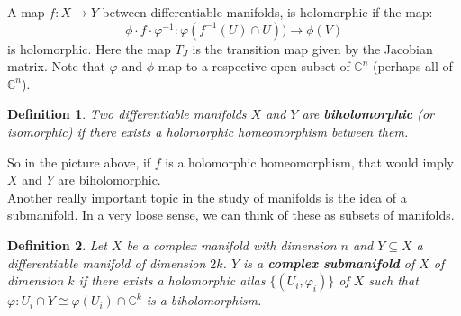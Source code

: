 \documentclass[12pt, letterpaper]{article}
\newtheorem{definition}{Definition}[section]
\newcommand{\C}{\mathbb{C}}
\newcommand{\ten}[1]{\textnormal{\textbf{#1}}}
\begin{document}
\begin{center}
\end{center}

\vspace{.5cm}

A map $f: X \to Y$ between differentiable manifolds, is holomorphic if the map:
\begin{equation*}
    \phi \cdot f \cdot \varphi^{-1}: \varphi(f^{-1}(U)\cap U)) \to \phi(V)
\end{equation*}
is holomorphic. Here the map $T_J$ is the transition map given by the Jacobian matrix.
Note that $\varphi$ and $\phi$ map to a respective open subset of $\C^n$ (perhaps all of $\C^n$).
\begin{definition}
Two differentiable manifolds $X$ and $Y$ are \ten{biholomorphic}
(or isomorphic) if there exists a holomorphic homeomorphism between them.
\end{definition}

So in the picture above, if $f$ is a holomorphic homeomorphism, that would imply
$X$ and $Y$ are biholomorphic.\\

Another really important topic in the study of manifolds is the idea of a submanifold.
In a very loose sense, we can think of these as subsets of manifolds.

\begin{definition}
    Let $X$ be a complex manifold with dimension $n$ and $Y \subseteq X$ a differentiable
    manifold of dimension $2k$. $Y$ is a \ten{complex submanifold} of $X$ of dimension
    $k$ if there exists a holomorphic atlas $\{ ( U_i, \varphi_i )\}$ of $X$ such
    that $\varphi: U_i \cap Y \cong \varphi(U_i) \cap \C^k$ is a biholomorphism.
\end{definition}
\end{document}
